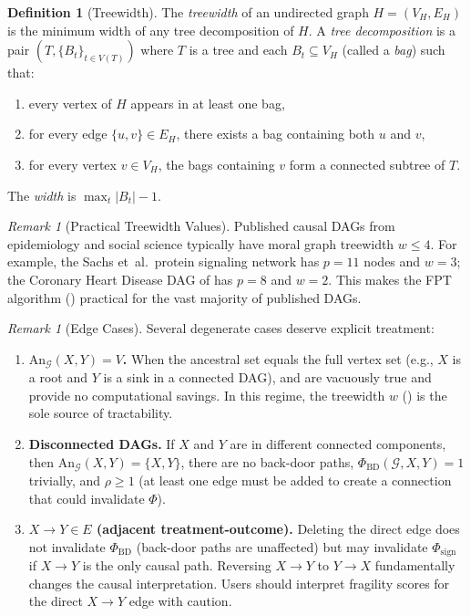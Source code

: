 \documentclass[11pt,a4paper]{article}
\theoremstyle{definition}
\newtheorem{definition}[theorem]{Definition}
\theoremstyle{remark}
\newtheorem{remark}[theorem]{Remark}
\newcommand{\DAG}{\mathcal{G}}
\newcommand{\An}{\mathrm{An}}
\newcommand{\radius}{\rho}
\newcommand{\Phi}{\varPhi}
\begin{document}
\begin{definition}[Treewidth]\label{def:treewidth}
The \emph{treewidth} of an undirected graph $H = (V_H, E_H)$ is the minimum width of
any tree decomposition of $H$. A \emph{tree decomposition} is a pair
$(T, \{B_t\}_{t \in V(T)})$ where $T$ is a tree and each $B_t \subseteq V_H$ (called
a \emph{bag}) such that:
\begin{enumerate}[label=(\alph*)]
  \item every vertex of $H$ appears in at least one bag,
  \item for every edge $\{u, v\} \in E_H$, there exists a bag containing both $u$ and $v$,
  \item for every vertex $v \in V_H$, the bags containing $v$ form a connected subtree
    of $T$.
\end{enumerate}
The \emph{width} is $\max_t |B_t| - 1$.
\end{definition}

\begin{remark}[Practical Treewidth Values]\label{rem:treewidth}
Published causal DAGs from epidemiology and social science typically have moral graph
treewidth $w \leq 4$. For example, the Sachs et~al.\ protein signaling network
\cite{sachs2005} has $p = 11$ nodes and $w = 3$; the Coronary Heart Disease DAG of
\cite{lauritzen1988} has $p = 8$ and $w = 2$. This makes the FPT algorithm
() practical for the vast majority of published DAGs.
\end{remark}

\begin{remark}[Edge Cases]\label{rem:edge_cases}
Several degenerate cases deserve explicit treatment:
\begin{enumerate}[label=(\alph*)]
  \item \textbf{$\An_\DAG(X,Y) = V$.} When the ancestral set equals the full vertex
    set (e.g., $X$ is a root and $Y$ is a sink in a connected DAG), 
    and  are vacuously true and provide no computational
    savings. In this regime, the treewidth $w$ () is the sole source of
    tractability.
  \item \textbf{Disconnected DAGs.} If $X$ and $Y$ are in different connected
    components, then $\An_\DAG(X,Y) = \{X, Y\}$, there are no back-door paths,
    $\Phi_{\mathrm{BD}}(\DAG, X, Y) = 1$ trivially, and $\radius \geq 1$ (at least
    one edge must be added to create a connection that could invalidate $\Phi$).
  \item \textbf{$X \to Y \in E$ (adjacent treatment-outcome).} Deleting the direct
    edge does not invalidate $\Phi_{\mathrm{BD}}$ (back-door paths are unaffected) but
    may invalidate $\Phi_{\mathrm{sign}}$ if $X \to Y$ is the only causal path.
    Reversing $X \to Y$ to $Y \to X$ fundamentally changes the causal interpretation.
    Users should interpret fragility scores for the direct $X \to Y$ edge with caution.
\end{enumerate}
\end{remark}
\end{document}
